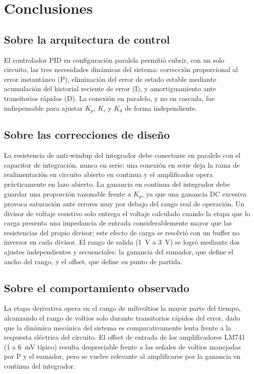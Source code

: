 \documentclass[conference]{IEEEtran}
\begin{document}
\FloatBarrier
\section{Conclusiones}

\subsection{Sobre la arquitectura de control}
El controlador PID en configuración paralela permitió cubrir, con un solo circuito, las tres necesidades dinámicas del sistema: corrección proporcional al error instantáneo (P), eliminación del error de estado estable mediante acumulación del historial reciente de error (I), y amortiguamiento ante transitorios rápidos (D). La conexión en paralelo, y no en cascada, fue indispensable para ajustar $K_p$, $K_i$ y $K_d$ de forma independiente.

\subsection{Sobre las correcciones de diseño}
La resistencia de anti-windup del integrador debe conectarse en paralelo con el capacitor de integración, nunca en serie: una conexión en serie deja la rama de realimentación en circuito abierto en continua y el amplificador opera prácticamente en lazo abierto. La ganancia en continua del integrador debe guardar una proporción razonable frente a $K_p$, ya que una ganancia DC excesiva provoca saturación ante errores muy por debajo del rango real de operación. Un divisor de voltaje resistivo solo entrega el voltaje calculado cuando la etapa que lo carga presenta una impedancia de entrada considerablemente mayor que las resistencias del propio divisor; este efecto de carga se resolvió con un buffer no inversor en cada divisor. El rango de salida (1~V a 3~V) se logró mediante dos ajustes independientes y secuenciales: la ganancia del sumador, que define el ancho del rango, y el offset, que define su punto de partida.

\subsection{Sobre el comportamiento observado}
La etapa derivativa opera en el rango de milivoltios la mayor parte del tiempo, alcanzando el rango de voltios solo durante transitorios rápidos del error, dado que la dinámica mecánica del sistema es comparativamente lenta frente a la respuesta eléctrica del circuito. El offset de entrada de los amplificadores LM741 (1 a 6~mV típico) resulta despreciable frente a las señales de voltios manejadas por P y el sumador, pero se vuelve relevante al amplificarse por la ganancia en continua del integrador.
\end{document}
